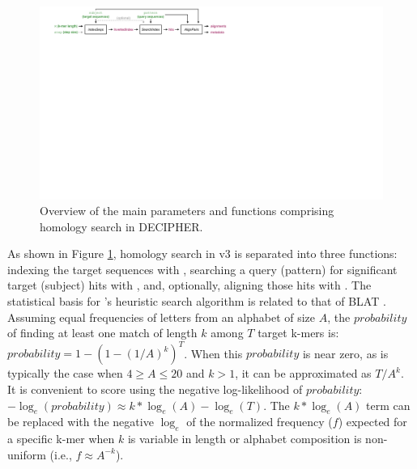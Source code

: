 \begin{figure}
\includegraphics[width=1\linewidth]{figures/Fig1} \caption{Overview of the main parameters and functions comprising homology search in DECIPHER.}\label{fig:fig1}
\end{figure}

As shown in Figure \ref{fig:fig1}, homology search in  v3 is separated into three functions: indexing the target sequences with , searching a query (pattern) for significant target (subject) hits with , and, optionally, aligning those hits with . The statistical basis for 's heuristic search algorithm is related to that of BLAT \citep{RN939}. Assuming equal frequencies of letters from an alphabet of size \(A\), the \(probability\) of finding at least one match of length \(k\) among \(T\) target k-mers is: \(probability = 1-(1-(1/A)^k)^T\). When this \(probability\) is near zero, as is typically the case when \(4 \ge A \le 20\) and \(k > 1\), it can be approximated as \(T/A^k\). It is convenient to score using the negative log-likelihood of \(probability\): \(-\log_e(probability) \approx k*\log_e(A) - \log_e(T)\). The \(k*\log_e(A)\) term can be replaced with the negative \(\log_e\) of the normalized frequency (\(f\)) expected for a specific k-mer when \(k\) is variable in length or alphabet composition is non-uniform (i.e., \(f \approx A^{-k}\)).

